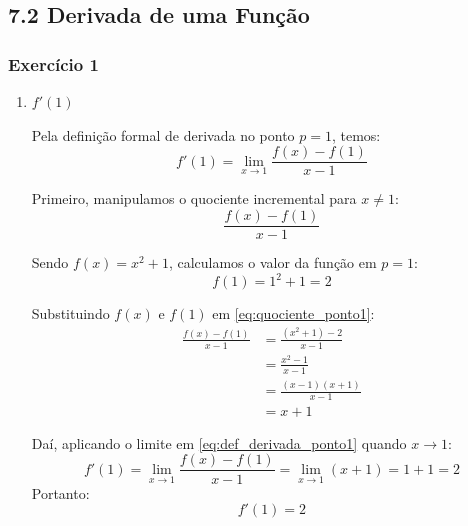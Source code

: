 \subsection*{7.2 Derivada de uma Função}

\vspace{0.4cm}
\subsubsection*{Exercício 1}

\begin{enumerate}[label=\alph*)]

    \item $f'(1)$
    \setcounter{equation}{0}

    Pela definição formal de derivada no ponto $p = 1$, temos:
    \begin{equation}
        f'(1) = \lim_{x \to 1} \frac{f(x) - f(1)}{x - 1} \label{eq:def_derivada_ponto1}
    \end{equation}

    Primeiro, manipulamos o quociente incremental para $x \neq 1$:
    \begin{equation}
        \frac{f(x) - f(1)}{x - 1} \label{eq:quociente_ponto1}
    \end{equation}

    Sendo $f(x) = x^2 + 1$, calculamos o valor da função em $p = 1$:
    \[
    f(1) = 1^2 + 1 = 2
    \]

    Substituindo $f(x)$ e $f(1)$ em \eqref{eq:quociente_ponto1}:
    \begin{align*}
        \frac{f(x) - f(1)}{x - 1} &= \frac{(x^2 + 1) - 2}{x - 1} \\[0.20cm]
        &= \frac{x^2 - 1}{x - 1} \\[0.20cm]
        &= \frac{(x - 1)(x + 1)}{x - 1} \\[0.20cm]
        &= x + 1
    \end{align*}

    Daí, aplicando o limite em \eqref{eq:def_derivada_ponto1} quando $x \to 1$:
    \[
    f'(1) = \lim_{x \to 1} \frac{f(x) - f(1)}{x - 1} = \lim_{x \to 1} (x + 1) = 1 + 1 = 2
    \]
    Portanto:
    \[
    f'(1) = 2
    \]



\end{enumerate}
